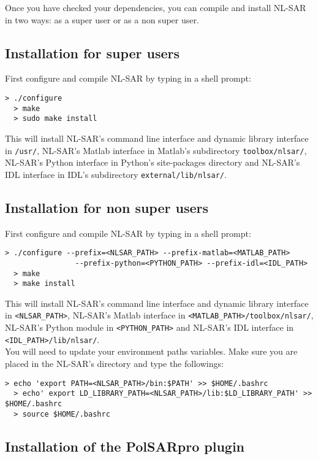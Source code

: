 \documentclass[10pt,french,english,a4paper]{article}
\begin{document}
Once you have checked your dependencies, you can compile and install NL-SAR in two ways:
as a super user or as a non super user.

\subsection{Installation for super users}

First configure and compile NL-SAR by typing in a shell prompt:
\begin{Verbatim}[frame=single]
  > ./configure
  > make
  > sudo make install
\end{Verbatim}
This will install NL-SAR's command line interface and
dynamic library interface in \texttt{/usr/},
NL-SAR's Matlab interface in Matlab's subdirectory \texttt{toolbox/nlsar/},
NL-SAR's Python interface in Python's site-packages directory
and NL-SAR's IDL interface in IDL's subdirectory \texttt{external/lib/nlsar/}.\\

\subsection{Installation for non super users}

First configure and compile NL-SAR by typing in a shell prompt:
\begin{Verbatim}[frame=single]
  > ./configure --prefix=<NLSAR_PATH> --prefix-matlab=<MATLAB_PATH>
                --prefix-python=<PYTHON_PATH> --prefix-idl=<IDL_PATH>
  > make
  > make install
\end{Verbatim}
This will install NL-SAR's command line interface and
dynamic library interface in \texttt{<NLSAR\_PATH>},
NL-SAR's Matlab interface in \texttt{<MATLAB\_PATH>/toolbox/nlsar/},
NL-SAR's Python module in \texttt{<PYTHON\_PATH>}
and NL-SAR's IDL interface in \texttt{<IDL\_PATH>/lib/nlsar/}.\\

You will need to update your environment paths variables.
Make sure you are placed in the NL-SAR's directory and type the followings:
\begin{Verbatim}[frame=single]
  > echo 'export PATH=<NLSAR_PATH>/bin:$PATH' >> $HOME/.bashrc
  > echo' export LD_LIBRARY_PATH=<NLSAR_PATH>/lib:$LD_LIBRARY_PATH' >> $HOME/.bashrc
  > source $HOME/.bashrc
\end{Verbatim}

\subsection{Installation of the PolSARpro plugin}
\end{document}

